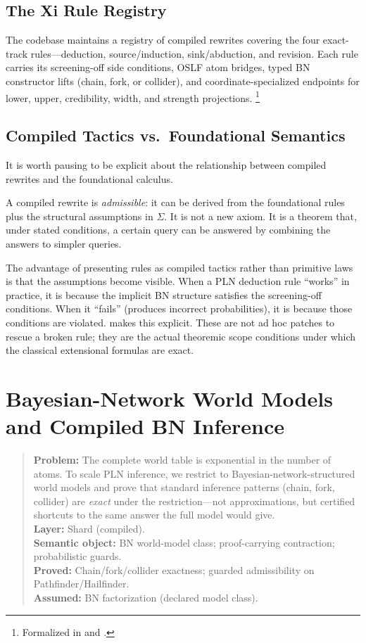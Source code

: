\documentclass[11pt,openany]{report}
\begin{document}
\section{The Xi Rule Registry}

The codebase maintains a registry of compiled rewrites covering the four
exact-track rules---deduction, source/induction, sink/abduction, and
revision.  Each rule carries its screening-off side conditions, OSLF atom
bridges, typed BN constructor lifts (chain, fork, or collider), and
coordinate-specialized endpoints for lower, upper, credibility, width,
and strength projections.%
\footnote{Formalized in  and
  .}

\section{Compiled Tactics vs.\ Foundational Semantics}

It is worth pausing to be explicit about the relationship between compiled
rewrites and the foundational calculus.

A compiled rewrite is \emph{admissible}: it can be derived from the
foundational rules plus the structural assumptions in $\Sigma$.  It is
not a new axiom.  It is a theorem that, under stated conditions, a certain
query can be answered by combining the answers to simpler queries.

The advantage of presenting rules as compiled tactics rather than primitive
laws is that the assumptions become visible.  When a PLN deduction rule
``works'' in practice, it is because the implicit BN structure satisfies
the screening-off conditions.  When it ``fails'' (produces incorrect
probabilities), it is because those conditions are violated.  \xiPLN{}
makes this explicit.  These are not ad hoc patches to rescue a broken
rule; they are the actual theoremic scope conditions under which the
classical extensional formulas are exact.


\chapter{Bayesian-Network World Models and Compiled BN Inference}
\label{ch:bn-models}

\begin{quote}\small
\textbf{Problem:} The complete world table is exponential in the number
of atoms.  To scale PLN inference, we restrict to Bayesian-network-structured
world models and prove that standard inference patterns (chain, fork,
collider) are \emph{exact} under the restriction---not approximations,
but certified shortcuts to the same answer the full model would give.\\[4pt]
\textbf{Layer:} Shard (compiled).\\
\textbf{Semantic object:} BN world-model class; proof-carrying contraction; probabilistic guards.\\
\textbf{Proved:} Chain/fork/collider exactness; guarded admissibility on Pathfinder/Hailfinder.\\
\textbf{Assumed:} BN factorization (declared model class).
\end{quote}
\end{document}
